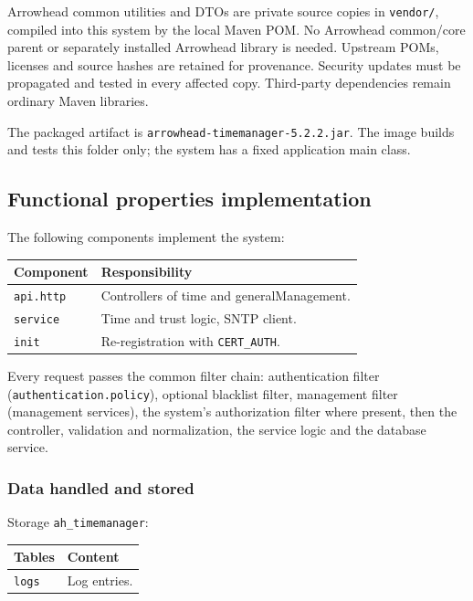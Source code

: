 \documentclass[a4paper]{arrowhead}
\begin{document}
Arrowhead common utilities and DTOs are private source copies in \texttt{vendor/}, compiled into this system by the local Maven POM. No Arrowhead common/core parent or separately installed Arrowhead library is needed. Upstream POMs, licenses and source hashes are retained for provenance. Security updates must be propagated and tested in every affected copy. Third-party dependencies remain ordinary Maven libraries.

The packaged artifact is \texttt{arrowhead-\allowbreak{}timemanager-5.2.2.jar}. The image builds and tests this folder only; the system has a fixed application main class.

\subsection{Functional properties implementation}

The following components implement the system:

\noindent\begin{longtable}{| p{5.6cm} | p{9.6cm} |} \hline
\rowcolor{gray!33} Component & Responsibility \\ \hline \endhead
\texttt{api.\allowbreak{}http} & Controllers of time and generalManagement. \\ \hline
\texttt{service} & Time and trust logic, SNTP client. \\ \hline
\texttt{init} & Re-registration with \texttt{CERT\_\allowbreak{}AUTH}. \\ \hline
\end{longtable}

Every request passes the common filter chain: authentication filter (\texttt{authentication.\allowbreak{}policy}), optional blacklist filter, management filter (management services), the system's authorization filter where present, then the controller, validation and normalization, the service logic and the database service.

\subsubsection{Data handled and stored}

Storage \texttt{ah\_\allowbreak{}timemanager}:

\noindent\begin{longtable}{| p{6.4cm} | p{8.8cm} |} \hline
\rowcolor{gray!33} Tables & Content \\ \hline \endhead
\texttt{logs} & Log entries. \\ \hline
\end{longtable}
\end{document}

